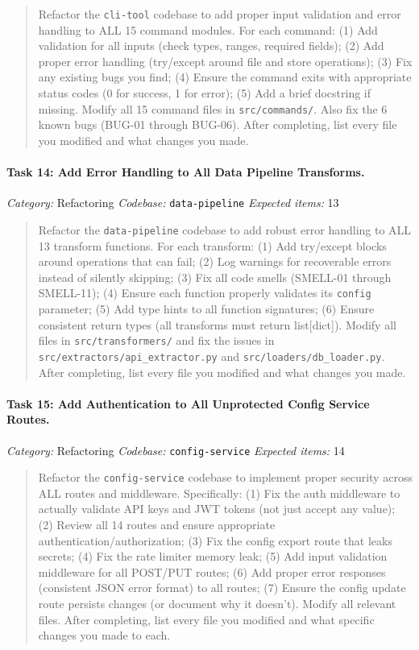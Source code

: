 \begin{quote}
Refactor the \texttt{cli-tool} codebase to add proper input validation and error handling to ALL 15 command modules. For each command: (1) Add validation for all inputs (check types, ranges, required fields); (2) Add proper error handling (try/except around file and store operations); (3) Fix any existing bugs you find; (4) Ensure the command exits with appropriate status codes (0 for success, 1 for error); (5) Add a brief docstring if missing. Modify all 15 command files in \texttt{src/commands/}. Also fix the 6 known bugs (BUG-01 through BUG-06). After completing, list every file you modified and what changes you made.
\end{quote}

\paragraph{Task 14: Add Error Handling to All Data Pipeline Transforms.}
\textit{Category:} Refactoring \quad
\textit{Codebase:} \texttt{data-pipeline} \quad
\textit{Expected items:} 13

\begin{quote}
Refactor the \texttt{data-pipeline} codebase to add robust error handling to ALL 13 transform functions. For each transform: (1) Add try/except blocks around operations that can fail; (2) Log warnings for recoverable errors instead of silently skipping; (3) Fix all code smells (SMELL-01 through SMELL-11); (4) Ensure each function properly validates its \texttt{config} parameter; (5) Add type hints to all function signatures; (6) Ensure consistent return types (all transforms must return list[dict]). Modify all files in \texttt{src/transformers/} and fix the issues in \texttt{src/extractors/api\_extractor.py} and \texttt{src/loaders/db\_loader.py}. After completing, list every file you modified and what changes you made.
\end{quote}

\paragraph{Task 15: Add Authentication to All Unprotected Config Service Routes.}
\textit{Category:} Refactoring \quad
\textit{Codebase:} \texttt{config-service} \quad
\textit{Expected items:} 14

\begin{quote}
Refactor the \texttt{config-service} codebase to implement proper security across ALL routes and middleware. Specifically: (1) Fix the auth middleware to actually validate API keys and JWT tokens (not just accept any value); (2) Review all 14 routes and ensure appropriate authentication/authorization; (3) Fix the config export route that leaks secrets; (4) Fix the rate limiter memory leak; (5) Add input validation middleware for all POST/PUT routes; (6) Add proper error responses (consistent JSON error format) to all routes; (7) Ensure the config update route persists changes (or document why it doesn't). Modify all relevant files. After completing, list every file you modified and what specific changes you made to each.
\end{quote}

